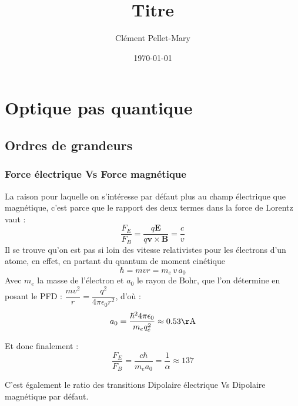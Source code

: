 \documentclass[a4paper]{report}
\title{Titre}
\author{Clément Pellet-Mary}
\date\today
\begin{document}
\chapter{Optique pas quantique}
  \section{Ordres de grandeurs}
  \subsection{Force électrique Vs Force magnétique}
  La raison pour laquelle on s’intéresse par défaut plus au champ électrique que magnétique, c'est parce que le rapport des deux termes dans la force de Lorentz vaut :\begin{equation}
  \dfrac{F_E}{F_B}=\dfrac{q\textbf{E}}{q\textbf{v}\times \textbf{B}}=\dfrac{c}{v}
  \end{equation}
  Il se trouve qu'on est pas si loin des vitesse relativistes pour les électrons d'un atome, en effet, en partant du quantum de moment cinétique \begin{equation}
  \hbar=mvr=m_e\,v\,a_0
  \end{equation}
  Avec $m_e$ la masse de l'électron et $a_0$ le rayon de Bohr, que l'on détermine en posant le PFD : $\dfrac{m v^2}{r}=\dfrac{q^2}{4\pi \epsilon_0r^2}$, d'où :\begin{equation}
  a_0=\dfrac{\hbar^2 4\pi\epsilon_0}{m_e q_e^2}\approx 0.53 \mathrm{\AA}
  \end{equation}
  
  Et donc finalement : \begin{equation}
  \dfrac{F_E}{F_B}=\dfrac{c\hbar}{m_e a_0}=\dfrac{1}{\alpha}\approx 137
  \end{equation}
  
  C'est également le ratio des transitions Dipolaire électrique Vs Dipolaire magnétique par défaut.
 
  
\end{document}

